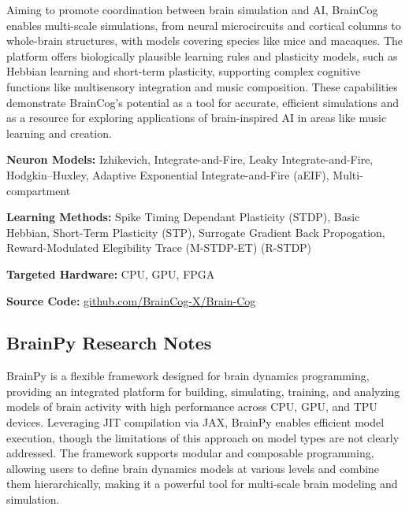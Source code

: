 Aiming to promote coordination between brain simulation and AI, BrainCog enables multi-scale simulations, from neural microcircuits and cortical columns to whole-brain structures, with models covering species like mice and macaques. The platform offers biologically plausible learning rules and plasticity models, such as Hebbian learning and short-term plasticity, supporting complex cognitive functions like multisensory integration and music composition. These capabilities demonstrate BrainCog’s potential as a tool for accurate, efficient simulations and as a resource for exploring applications of brain-inspired AI in areas like music learning and creation.

\begin{tcolorbox}[enhanced,attach boxed title to top center={yshift=-3mm,yshifttext=-1mm}, colback=blue!5!white,colframe=blue!75!black,colbacktitle=red!80!black, title=BrainCog at a Glance,fonttitle=\bfseries, boxed title style={size=small,colframe=red!50!black} ]

\textbf{Neuron Models:} Izhikevich, Integrate-and-Fire, Leaky Integrate-and-Fire, Hodgkin–Huxley, Adaptive Exponential  Integrate-and-Fire (aEIF), Multi-compartment

\textbf{Learning Methods:} Spike Timing Dependant Plasticity (STDP), Basic Hebbian, Short-Term Plasticity (STP), Surrogate Gradient Back Propogation, Reward-Modulated Elegibility Trace (M-STDP-ET) (R-STDP)  

\textbf{Targeted Hardware:} CPU, GPU, FPGA 

\textbf{Source Code:} \href{https://github.com/BrainCog-X/Brain-Cog}{github.com/BrainCog-X/Brain-Cog}
\end{tcolorbox}
\subsection*{BrainPy Research Notes}\label{BrainPy}

BrainPy is a flexible framework designed for brain dynamics programming, providing an integrated platform for building, simulating, training, and analyzing models of brain activity with high performance across CPU, GPU, and TPU devices. Leveraging JIT compilation via JAX, BrainPy enables efficient model execution, though the limitations of this approach on model types are not clearly addressed. The framework supports modular and composable programming, allowing users to define brain dynamics models at various levels and combine them hierarchically, making it a powerful tool for multi-scale brain modeling and simulation.

